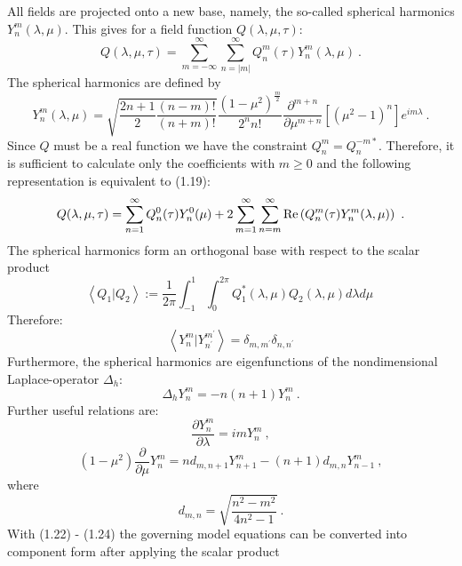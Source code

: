 All fields are projected onto a new base, namely, the so-called spherical harmonics $Y_n^m(\lambda,\mu)$. This gives for a field function $Q(\lambda,\mu,\tau)$:
\begin{equation}
Q(\lambda, \mu,\tau)=\sum_{m=-\infty}^{\infty} \sum_{n=|m|}^{\infty} Q_n^m(\tau) Y_n^m(\lambda,\mu)~.
\end{equation}
The spherical harmonics are defined by
\begin{equation}
Y^m_n(\lambda,\mu)=
\sqrt{\frac {2 n + 1} 2  \frac {(n-m)!} {(n+m)!}} \frac {(1- \mu^2)^{\frac m 2}} {2^n n!}
 \frac {\partial^{m+n}} {\partial \mu^{m+n}} \left [  (\mu^2 - 1)^n \right ]
e^{i m \lambda}~.
\end{equation}
Since $Q$ must be a real function we have the constraint $Q_n^m=Q_n^{-m*}$. Therefore, it is sufficient
to calculate only the coefficients with $m \ge0$ and the following representation is equivalent to (1.19):
\begin{equation}
Q(\lambda, \mu,\tau)=\sum_{n=1}^{\infty} Q_n^0(\tau) Y_n^0(\mu) + 2 \sum_{m=1}^{\infty} \sum_{n=m}^{\infty} {\rm Re} \left (Q_n^m(\tau) Y_n^m(\lambda,\mu) \right )~.
\end{equation}
The spherical harmonics form an orthogonal base with respect to the scalar product
\begin{equation}
\left < Q_1 | Q_2  \right > :=  \frac 1 {2 \pi} \int_{-1}^{1} \int_{0}^{2\pi} Q_1^*(\lambda,\mu) Q_2({\lambda,\mu}) d\lambda d\mu~
\end{equation}
Therefore:
\begin{equation}
\left < Y_n^m | Y_{n^{\prime}}^{m^{\prime}}  \right > = \delta_{m,m^{\prime}} \delta_{n,n^{\prime}}
\end{equation}
Furthermore, the spherical harmonics are eigenfunctions of the nondimensional
 {\sc Laplace}-operator $\Delta_h$:
\begin{equation}
\Delta_h Y_n^m=- n (n+1) Y_n^m~.
\end{equation}
Further useful relations are:
\begin{equation}
\frac {\partial Y^m_n} {\partial \lambda} 
=  i m   Y^m_n~,
\end{equation}
\begin{equation}
(1 - \mu^2) \frac {\partial } {\partial \mu} Y^m_n
=  n  d_{m,n+1} Y^m_{n+1} -  (n+1) d_{m,n} Y^m_{n-1}~, 
\end{equation}
where
\[
d_{m,n}=\sqrt{ \frac {n^2 - m^2} {4 n^2 -1} }~.
\]
With (1.22) - (1.24) the governing model equations can be converted into component form after applying the scalar product
